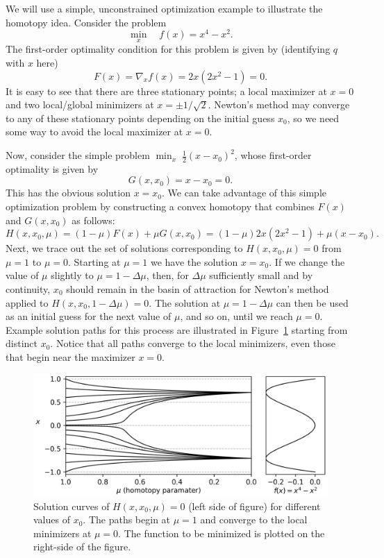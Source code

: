 We will use a simple, unconstrained optimization example to illustrate the
homotopy idea. Consider the problem
\begin{equation*}
\min_x  \quad  f(x) = x^4 - x^2.
\end{equation*}
The first-order optimality condition for this problem is given by (identifying
$q$ with $x$ here)
\begin{equation*}
F(x) = \nabla_x f(x) = 2x(2x^2 - 1) = 0.
\end{equation*}
It is easy to see that there are three stationary points; a local maximizer at
$x=0$ and two local/global minimizers at $x=\pm 1/\sqrt{2}$.  Newton's method
may converge to any of these stationary points depending on the initial guess
$x_0$, so we need some way to avoid the local maximizer at $x=0$.

Now, consider the simple problem $\min_x \; \frac{1}{2}(x - x_0)^2$, whose
first-order optimality is given by
\begin{equation*}
G(x,x_0) = x - x_0 = 0.
\end{equation*}
This has the obvious solution $x=x_0$.  We can take advantage of this simple
optimization problem by constructing a convex homotopy that combines $F(x)$ and
$G(x,x_0)$ as follows:
\begin{equation*}
  H(x, x_0, \mu) = (1-\mu) F(x) + \mu G(x, x_0) = (1 - \mu) 2x(2x^2 -1) + \mu (x
  - x_0).
\end{equation*}
Next, we trace out the set of solutions corresponding to $H(x,x_0,\mu)=0$ from
$\mu=1$ to $\mu=0$.  Starting at $\mu=1$ we have the solution $x=x_0$.  If we
change the value of $\mu$ slightly to $\mu = 1 - \Delta \mu$, then, for $\Delta
\mu$ sufficiently small and by continuity, $x_0$ should remain in the basin of
attraction for Newton's method applied to $H(x, x_0, 1-\Delta \mu)=0$.  The
solution at $\mu= 1 - \Delta \mu$ can then be used as an initial guess for the
next value of $\mu$, and so on, until we reach $\mu = 0$.  Example solution
paths for this process are illustrated in Figure~\ref{fig:zc} starting from
distinct $x_0$.  Notice that all paths converge to the local minimizers, even
those that begin near the maximizer $x=0$.

\begin{figure}[t]
  \centering
  \includegraphics[width=\textwidth]{./figs/chap2/paths.png}
  \caption{Solution curves of $H(x,x_0,\mu) = 0$ (left side of figure) for
    different values of $x_0$.  The paths begin at $\mu=1$ and converge to the
    local minimizers at $\mu=0$.  The function to be minimized is plotted on the
    right-side of the figure.\label{fig:zc}}
\end{figure}

